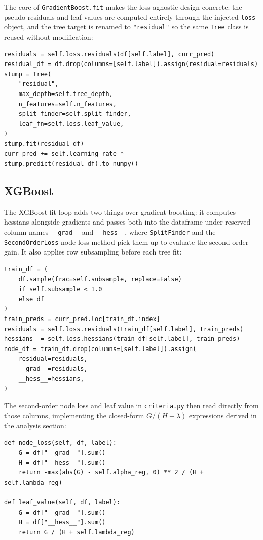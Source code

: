 \documentclass[a4paper, 11pt]{article}
\begin{document}
The core of \texttt{GradientBoost.fit} makes the loss-agnostic
design concrete: the pseudo-residuals and leaf values are computed
entirely through the injected \texttt{loss} object, and the tree
target is renamed to \texttt{"residual"} so the same \texttt{Tree}
class is reused without modification:

\begin{verbatim}
residuals = self.loss.residuals(df[self.label], curr_pred)
residual_df = df.drop(columns=[self.label]).assign(residual=residuals)
stump = Tree(
    "residual",
    max_depth=self.tree_depth,
    n_features=self.n_features,
    split_finder=self.split_finder,
    leaf_fn=self.loss.leaf_value,
)
stump.fit(residual_df)
curr_pred += self.learning_rate * stump.predict(residual_df).to_numpy()
\end{verbatim}

\subsection{XGBoost}

The XGBoost fit loop adds two things over gradient boosting: it
computes hessians alongside gradients and passes both into the
dataframe under reserved column names \texttt{\_\_grad\_\_} and
\texttt{\_\_hess\_\_}, where \texttt{SplitFinder} and the
\texttt{SecondOrderLoss} node-loss method pick them up to evaluate
the second-order gain. It also applies row subsampling before each
tree fit:

\begin{verbatim}
train_df = (
    df.sample(frac=self.subsample, replace=False)
    if self.subsample < 1.0
    else df
)
train_preds = curr_pred.loc[train_df.index]
residuals = self.loss.residuals(train_df[self.label], train_preds)
hessians  = self.loss.hessians(train_df[self.label], train_preds)
node_df = train_df.drop(columns=[self.label]).assign(
    residual=residuals,
    __grad__=residuals,
    __hess__=hessians,
)
\end{verbatim}

The second-order node loss and leaf value in \texttt{criteria.py}
then read directly from those columns, implementing the closed-form
$G/(H + \lambda)$ expressions derived in the analysis section:

\begin{verbatim}
def node_loss(self, df, label):
    G = df["__grad__"].sum()
    H = df["__hess__"].sum()
    return -max(abs(G) - self.alpha_reg, 0) ** 2 / (H + self.lambda_reg)

def leaf_value(self, df, label):
    G = df["__grad__"].sum()
    H = df["__hess__"].sum()
    return G / (H + self.lambda_reg)
\end{verbatim}
\end{document}
